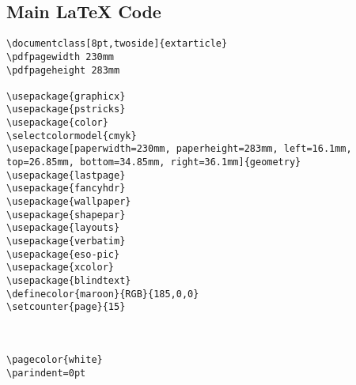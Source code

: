\subsection{Main \LaTeX{} Code}
\begin{verbatim}
\documentclass[8pt,twoside]{extarticle}
\pdfpagewidth 230mm
\pdfpageheight 283mm

\usepackage{graphicx} 
\usepackage{pstricks}
\usepackage{color}
\selectcolormodel{cmyk}
\usepackage[paperwidth=230mm, paperheight=283mm, left=16.1mm, top=26.85mm, bottom=34.85mm, right=36.1mm]{geometry}
\usepackage{lastpage}
\usepackage{fancyhdr}
\usepackage{wallpaper}
\usepackage{shapepar}
\usepackage{layouts}
\usepackage{verbatim}
\usepackage{eso-pic}
\usepackage{xcolor}
\usepackage{blindtext}
\definecolor{maroon}{RGB}{185,0,0}
\setcounter{page}{15}



\pagecolor{white}
\parindent=0pt











\end{verbatim}